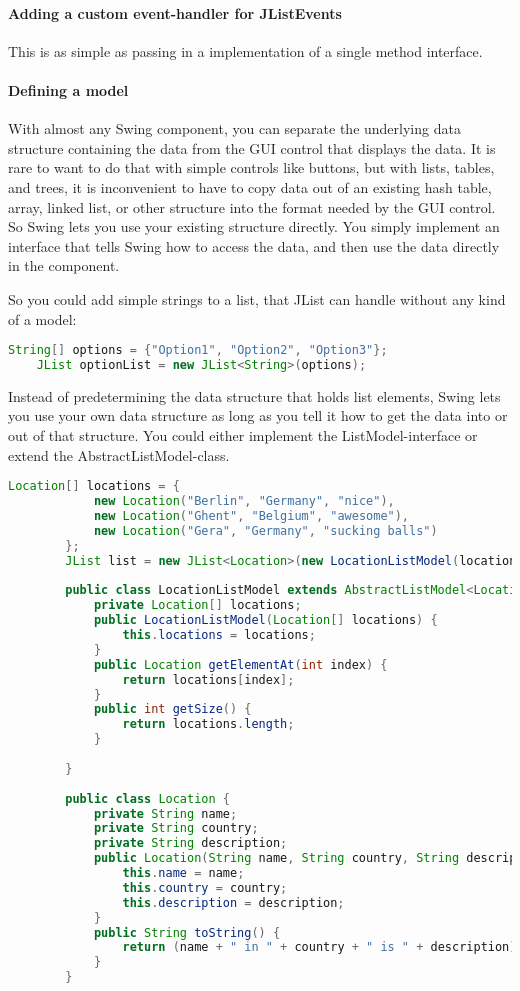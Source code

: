  \paragraph{Adding a custom event-handler for JListEvents} This is as simple as passing in a implementation of a single method interface.
 
 \paragraph{Defining a model} With almost any Swing component, you can separate the underlying data structure containing the data from the GUI control that displays the data. It is rare to want to do that with simple controls like buttons, but with lists, tables, and trees, it is inconvenient to have to copy data out of an existing hash table, array, linked list, or other structure into the format needed by the GUI control. So Swing lets you use your existing structure directly. You simply implement an interface that tells Swing how to access the data, and then use the data directly in the component. 
 
 So you could add simple strings to a list, that JList can handle without any kind of a model:
 
 \begin{lstlisting}[language=java]
    String[] options = {"Option1", "Option2", "Option3"};
    JList optionList = new JList<String>(options);
 \end{lstlisting}
 
Instead of predetermining the data structure that holds list elements, Swing lets you use your own data structure as long as you tell it how to get the data into or out of that structure. You could either implement the ListModel-interface or extend the AbstractListModel-class.
 
 \begin{lstlisting}[language=java]
        Location[] locations = {
			new Location("Berlin", "Germany", "nice"),
			new Location("Ghent", "Belgium", "awesome"),
			new Location("Gera", "Germany", "sucking balls")
		};
		JList list = new JList<Location>(new LocationListModel(locations));
		
		public class LocationListModel extends AbstractListModel<Location>{
        	private Location[] locations;
        	public LocationListModel(Location[] locations) {
        		this.locations = locations;
        	}
        	public Location getElementAt(int index) {
        		return locations[index];
        	}
        	public int getSize() {
        		return locations.length;
        	}
        
        }
        
        public class Location {
        	private String name;
        	private String country;
        	private String description;
        	public Location(String name, String country, String description) {
        		this.name = name;
        		this.country = country;
        		this.description = description;
        	}
        	public String toString() {
        		return (name + " in " + country + " is " + description);
        	}
        }
 \end{lstlisting}
 
